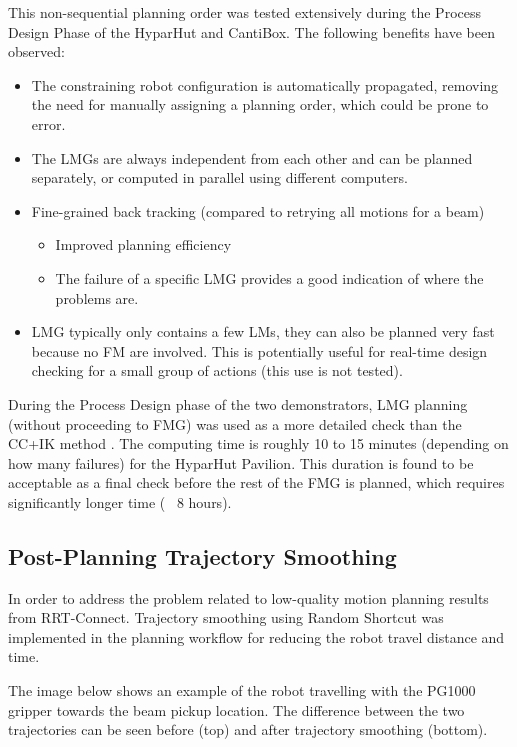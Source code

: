 This non-sequential planning order was tested extensively during the Process Design Phase of the HyparHut and CantiBox. The following benefits have been observed:
\begin{itemize}
    \item The constraining robot configuration is automatically propagated, removing the need for manually assigning a planning order, which could be prone to error.
    \item The LMGs are always independent from each other and can be planned separately, or computed in parallel using different computers.
    \item Fine-grained back tracking (compared to retrying all motions for a beam)
    \begin{itemize}
        \item Improved planning efficiency
        \item The failure of a specific LMG provides a good indication of where the problems are.
    \end{itemize}
    \item LMG typically only contains a few LMs, they can also be planned very fast because no FM are involved. This is potentially useful for real-time design checking for a small group of actions (this use is not tested).
\end{itemize}

During the Process Design phase of the two demonstrators, LMG planning (without proceeding to FMG) was used as a more detailed check than the CC+IK method . The computing time is roughly 10 to 15 minutes (depending on how many failures) for the HyparHut Pavilion. This duration is found to be acceptable as a final check before the rest of the FMG is planned, which requires significantly longer time (~ 8 hours).

\subsection{Post-Planning Trajectory Smoothing}
\label{subsection:exploration_4_post_planning_trajectory_smoothing}

In order to address the problem related to low-quality motion planning results from RRT-Connect. Trajectory smoothing using Random Shortcut \parencite{zhaoTrajectorySmoothingUsing2015} was implemented in the planning workflow for reducing the robot travel distance and time.

The image below shows an example of the robot travelling with the PG1000 gripper towards the beam pickup location. The difference between the two trajectories can be seen before (top) and after trajectory smoothing (bottom). 

